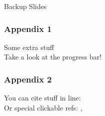 \documentclass[mathserif, fleqn]{beamer}
\begin{document}
%         

\appendix
\backupbegin

\begin{frame}[plain]
  \begin{center}
    {\Huge{}Backup Slides}
  \end{center}
\end{frame}

\begin{frame}\frametitle{Appendix 1}
  Some extra stuff\\[2ex]
  Take a look at the progress bar!
\end{frame}

\begin{frame}\frametitle{Appendix 2}
  You can cite stuff in line: \\
  Or special clickable refs: , 
\end{frame}

\backupend
\end{document}

